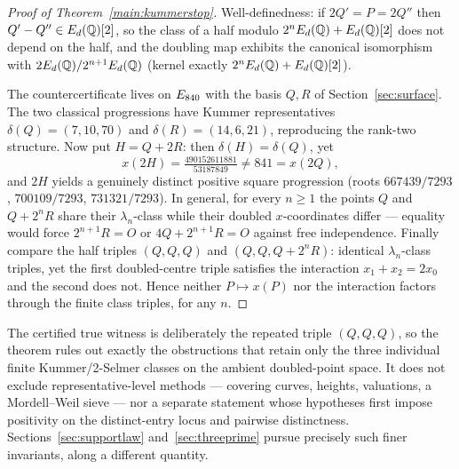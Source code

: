 \begin{proof}[Proof of Theorem~\ref{main:kummerstop}]
Well-definedness: if $2Q'=P=2Q''$ then $Q'-Q''\in E_d(\mathbb{Q})[2]$, so the class
of a half modulo $2^nE_d(\mathbb{Q})+E_d(\mathbb{Q})[2]$ does not depend on the half, and
the doubling map exhibits the canonical isomorphism with
$2E_d(\mathbb{Q})/2^{n+1}E_d(\mathbb{Q})$ (kernel exactly $2^nE_d(\mathbb{Q})+E_d(\mathbb{Q})[2]$).

The countercertificate lives on $E_{840}$ with the basis $Q,R$ of
Section~\ref{sec:surface}. The two classical progressions have Kummer
representatives $\delta(Q)=(7,10,70)$ and $\delta(R)=(14,6,21)$,
reproducing the rank-two structure. Now put $H=Q+2R$: then
$\delta(H)=\delta(Q)$, yet
\[
x(2H)=\tfrac{490152611881}{53187849}\neq841=x(2Q),
\]
and $2H$ yields a genuinely distinct positive square progression (roots
$667439/7293$, $700109/7293$, $731321/7293$). In general, for every
$n\ge1$ the points $Q$ and $Q+2^nR$ share their $\lambda_n$-class while
their doubled $x$-coordinates differ --- equality would force
$2^{n+1}R=O$ or $4Q+2^{n+1}R=O$ against free independence. Finally compare
the half triples $(Q,Q,Q)$ and $(Q,Q,Q+2^nR)$: identical
$\lambda_n$-class triples, yet the first doubled-centre triple satisfies
the interaction $x_1+x_2=2x_0$ and the second does not. Hence neither
$P\mapsto x(P)$ nor the interaction factors through the finite class
triples, for any $n$.
\end{proof}

\begin{remark}
The certified true witness is deliberately the repeated triple $(Q,Q,Q)$,
so the theorem rules out exactly the obstructions that retain only the
three individual finite Kummer/2-Selmer classes on the ambient
doubled-point space. It does not exclude representative-level methods ---
covering curves, heights, valuations, a Mordell--Weil sieve --- nor a
separate statement whose hypotheses first impose positivity on the distinct-entry locus
and pairwise distinctness. Sections~\ref{sec:supportlaw}
and~\ref{sec:threeprime} pursue precisely such finer invariants, along a
different quantity.
\end{remark}
